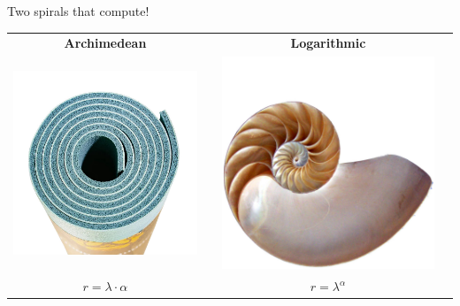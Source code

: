 \documentclass[14pt]{beamer}
\begin{document}
    \begin{frame}{Two spirals that compute!}
        \begin{center}
            \begin{tabular}{cccc}
                \textbf{Archimedean} & \qquad & \textbf{Logarithmic} & \quad \\[1ex]
                \includegraphics[width=20ex]{pictures/Yoga.jpg} & &
                \includegraphics[width=20ex]{pictures/Nautilus.jpg} & \\[1ex]
                {\Large $r = \lambda\cdot\alpha$ } & & {\Large $r = \lambda^\alpha$ } & \\
            \end{tabular}
        \end{center}
    \end{frame}

\end{document}
